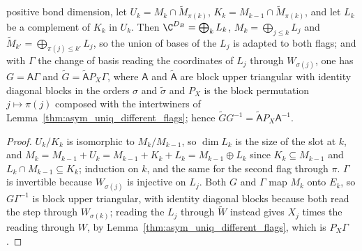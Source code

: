 \begin{lemma}
    positive bond dimension, let $U_k=M_k\cap\widetilde M_{\pi(k)}$,
    $K_k=M_{k-1}\cap\widetilde M_{\pi(k)}$, and let $L_k$ be a complement of $K_k$ in $U_k$. Then
    $\C^{D_B}=\bigoplus_kL_k$, $M_k=\bigoplus_{j\leq k}L_j$ and $\widetilde M_{k'}=\bigoplus_{\pi(j)\leq k'}L_j$,
    so the union of bases of the $L_j$ is adapted to both flags; and with $\Gamma$ the change of
    basis reading the coordinates of $L_j$ through $W_{\sigma(j)}$, one has $G=\mathsf A\Gamma$ and
    $\widetilde G=\widetilde{\mathsf A}P_X\Gamma$, where $\mathsf A$ and $\widetilde{\mathsf A}$ are block
    upper triangular with identity diagonal blocks in the orders $\sigma$ and $\widetilde\sigma$ and
    $P_X$ is the block permutation $j\mapsto\pi(j)$ composed with the intertwiners of
    Lemma~\ref{thm:asym_uniq_different_flags}; hence $\widetilde GG^{-1}=\widetilde{\mathsf A}P_X\mathsf A^{-1}$.
\end{lemma}

\begin{proof}
    \leanok
    $U_k/K_k$ is isomorphic to $M_k/M_{k-1}$, so $\dim L_k$ is the size of the slot at $k$, and
    $M_k=M_{k-1}+U_k=M_{k-1}+K_k+L_k=M_{k-1}\oplus L_k$ since $K_k\subseteq M_{k-1}$ and $L_k\cap M_{k-1}\subseteq K_k$;
    induction on $k$, and the same for the second flag through $\pi$. $\Gamma$ is invertible because
    $W_{\sigma(j)}$ is injective on $L_j$. Both $G$ and $\Gamma$ map $M_k$ onto $E_k$, so $G\Gamma^{-1}$ is
    block upper triangular, with identity diagonal blocks because both read the step through
    $W_{\sigma(k)}$; reading the $L_j$ through $\widetilde W$ instead gives $X_j$ times the reading
    through $W$, by Lemma~\ref{thm:asym_uniq_different_flags}, which is $P_X\Gamma$.
\end{proof}

